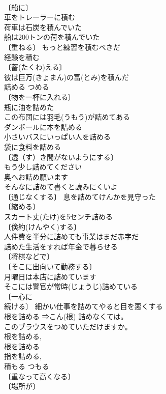 \documentclass[8pt]{extreport}
\begin{document}
\begin{CJK}{UTF8}{min}
\\	〔船に〕
\\	車をトレーラーに積む 
\\	荷車は石炭を積んでいた 
\\	船は200トンの荷を積んでいた 
\\	〔重ねる〕 もっと練習を積むべきだ 
\\	経験を積む 
\\	〔蓄(たくわ)える〕
\\	彼は巨万(きょまん)の富(とみ)を積んだ 
\\	詰める	つめる	
\\	〔物を一杯に入れる〕
\\	瓶に油を詰めた 
\\	この布団には羽毛(うもう)が詰めてある 
\\	ダンボールに本を詰める 
\\	小さいバスにいっぱい人を詰める 
\\	袋に食料を詰める 
\\	〔透（す）き間がないようにする〕 
\\	もう少し詰めてください 
\\	奥へお詰め願います 
\\	そんなに詰めて書くと読みにくいよ 
\\	〔通じなくする〕 息を詰めてけんかを見守った 
\\	〔縮める〕
\\	スカート丈(たけ)を5センチ詰める 
\\	〔倹約(けんやく)する〕
\\	人件費を半分に詰めても事業はまだ赤字だ 
\\	詰めた生活をすれば年金で暮らせる 
\\	〔将棋などで〕
\\	〔そこに出向いて勤務する〕 
\\	月曜日は本店に詰めています 
\\	そこには警官が常時(じょうじ)詰めている 
\\	〔一心に
\\	続ける〕 細かい仕事を詰めてやると目を悪くする 
\\	根を詰める ⇒こん(根) 詰めなくては。
\\	このブラウスをつめていただけますか。
\\	根を詰める, 
\\	根を詰める 
\\	指を詰める, 
\\	積もる	つもる	
\\	〔重なって高くなる〕
\\	〔場所が〕

\end{CJK}
\end{document}
